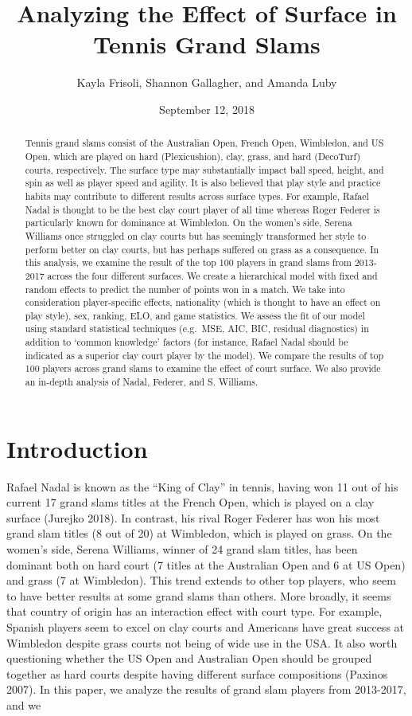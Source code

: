 \documentclass[]{article}
\title{Analyzing the Effect of Surface in Tennis Grand Slams}
\author{Kayla Frisoli, Shannon Gallagher, and Amanda Luby}
\date{September 12, 2018}
\begin{document}
\maketitle
\begin{abstract}
Tennis grand slams consist of the Australian Open, French Open,
Wimbledon, and US Open, which are played on hard (Plexicushion), clay,
grass, and hard (DecoTurf) courts, respectively. The surface type may
substantially impact ball speed, height, and spin as well as player
speed and agility. It is also believed that play style and practice
habits may contribute to different results across surface types. For
example, Rafael Nadal is thought to be the best clay court player of all
time whereas Roger Federer is particularly known for dominance at
Wimbledon. On the women's side, Serena Williams once struggled on clay
courts but has seemingly transformed her style to perform better on clay
courts, but has perhaps suffered on grass as a consequence. In this
analysis, we examine the result of the top 100 players in grand slams
from 2013-2017 across the four different surfaces. We create a
hierarchical model with fixed and random effects to predict the number
of points won in a match. We take into consideration player-specific
effects, nationality (which is thought to have an effect on play style),
sex, ranking, ELO, and game statistics. We assess the fit of our model
using standard statistical techniques (e.g.~MSE, AIC, BIC, residual
diagnostics) in addition to `common knowledge' factors (for instance,
Rafael Nadal should be indicated as a superior clay court player by the
model). We compare the results of top 100 players across grand slams to
examine the effect of court surface. We also provide an in-depth
analysis of Nadal, Federer, and S. Williams.
\end{abstract}

\hypertarget{sec:iintro}{%
\section{Introduction}\label{sec:iintro}}

Rafael Nadal is known as the ``King of Clay'' in tennis, having won 11
out of his current 17 grand slams titles at the French Open, which is
played on a clay surface (Jurejko 2018). In contrast, his rival Roger
Federer has won his most grand slam titles (8 out of 20) at Wimbledon,
which is played on grass. On the women's side, Serena Williams, winner
of 24 grand slam titles, has been dominant both on hard court (7 titles
at the Australian Open and 6 at US Open) and grass (7 at Wimbledon).
This trend extends to other top players, who seem to have better results
at some grand slams than others. More broadly, it seems that country of
origin has an interaction effect with court type. For example, Spanish
players seem to excel on clay courts and Americans have great success at
Wimbledon despite grass courts not being of wide use in the USA. It also
worth questioning whether the US Open and Australian Open should be
grouped together as hard courts despite having different surface
compositions (Paxinos 2007). In this paper, we analyze the results of
grand slam players from 2013-2017, and we
\end{document}

